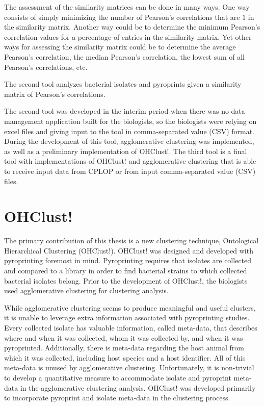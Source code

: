 \documentclass[12pt]{ucthesis}
\begin{document}
      The assessment of the similarity matrices can be done in many ways. One way
      consists of simply minimizing the number of Pearson's correlations that are
      $1$ in the similarity matrix. Another way could be to determine the minimum
      Pearson's correlation values for a percentage of entries in the similarity
      matrix. Yet other ways for assessing the similarity matrix could be to
      determine the average Pearson's correlation, the median Pearson's
      correlation, the lowest sum of all Pearson's correlations, etc.

   The second tool analyzes bacterial isolates and pyroprints given a
   similarity matrix of Pearson's correlations.

   The second tool was developed in the interim period when there was no data
   management application built for the biologists, so the biologists were
   relying on excel files and giving input to the tool in comma-separated value
   (CSV) format. During the development of this tool, \textsf{agglomerative
   clustering} was implemented, as well as a preliminary implementation of
   OHClust!. The third tool is a final tool with implementations of OHClust!
   and \textsf{agglomerative clustering} that is able to receive input data
   from CPLOP or from input comma-separated value (CSV) files.




\chapter{OHClust!}\label{chap:algorithm}
   The primary contribution of this thesis is a new clustering technique,
   \textsf{Ontological Hierarchical Clustering} (\textsf{OHClust!}).
   \textsf{OHClust!} was designed and developed with pyroprinting foremost in
   mind. Pyroprinting requires that isolates are collected and compared to a
   library in order to find bacterial strains to which collected bacterial
   isolates belong. Prior to the development of \textsf{OHClust!}, the
   biologists used \textsf{agglomerative clustering} for clustering analysis.

   While \textsf{agglomerative clustering} seems to produce meaningful and
   useful clusters, it is unable to leverage extra information associated with
   pyroprinting studies. Every collected isolate has valuable information,
   called meta-data, that describes where and when it was collected, whom it
   was collected by, and when it was pyroprinted. Additionally, there is
   meta-data regarding the host animal from which it was collected, including
   host species and a host identifier. All of this meta-data is unused by
   \textsf{agglomerative clustering}. Unfortunately, it is non-trivial to
   develop a quantitative measure to accommodate isolate and pyroprint
   meta-data in the \textsf{agglomerative clustering} analysis.
   \textsf{OHClust!} was developed primarily to incorporate pyroprint and
   isolate meta-data in the clustering process.
\end{document}
